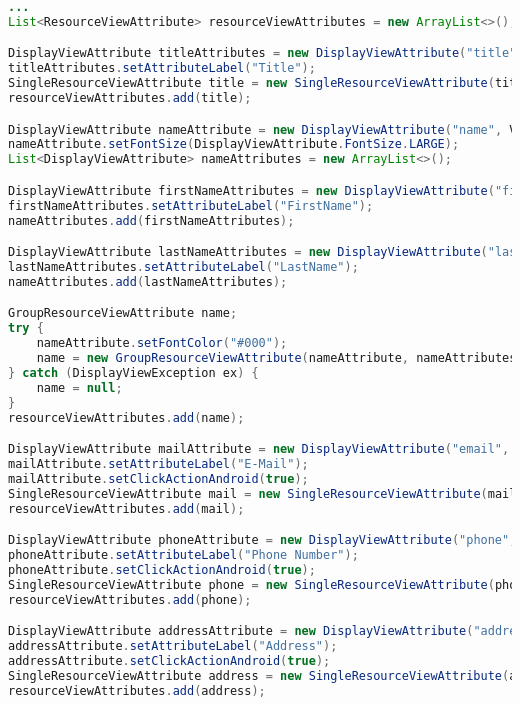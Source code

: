 \begin{lstlisting}[label=lst:cardview_impl,
language=java,
firstnumber=1,
caption=Erstellung einer CardView.]			
...
List<ResourceViewAttribute> resourceViewAttributes = new ArrayList<>();

DisplayViewAttribute titleAttributes = new DisplayViewAttribute("title", ViewAttribute.AttributeType.TEXT);
titleAttributes.setAttributeLabel("Title");
SingleResourceViewAttribute title = new SingleResourceViewAttribute(titleAttributes);
resourceViewAttributes.add(title);

DisplayViewAttribute nameAttribute = new DisplayViewAttribute("name", ViewAttribute.AttributeType.TEXT);
nameAttribute.setFontSize(DisplayViewAttribute.FontSize.LARGE);
List<DisplayViewAttribute> nameAttributes = new ArrayList<>();

DisplayViewAttribute firstNameAttributes = new DisplayViewAttribute("firstName", ViewAttribute.AttributeType.TEXT);
firstNameAttributes.setAttributeLabel("FirstName");
nameAttributes.add(firstNameAttributes);

DisplayViewAttribute lastNameAttributes = new DisplayViewAttribute("lastName", ViewAttribute.AttributeType.TEXT);
lastNameAttributes.setAttributeLabel("LastName");
nameAttributes.add(lastNameAttributes);

GroupResourceViewAttribute name;
try {
	nameAttribute.setFontColor("#000");
	name = new GroupResourceViewAttribute(nameAttribute, nameAttributes);
} catch (DisplayViewException ex) {
	name = null;
}
resourceViewAttributes.add(name);

DisplayViewAttribute mailAttribute = new DisplayViewAttribute("email", ViewAttribute.AttributeType.MAIL);
mailAttribute.setAttributeLabel("E-Mail");
mailAttribute.setClickActionAndroid(true);
SingleResourceViewAttribute mail = new SingleResourceViewAttribute(mailAttribute);
resourceViewAttributes.add(mail);

DisplayViewAttribute phoneAttribute = new DisplayViewAttribute("phone", ViewAttribute.AttributeType.PHONE_NUMBER);
phoneAttribute.setAttributeLabel("Phone Number");
phoneAttribute.setClickActionAndroid(true);
SingleResourceViewAttribute phone = new SingleResourceViewAttribute(phoneAttribute);
resourceViewAttributes.add(phone);

DisplayViewAttribute addressAttribute = new DisplayViewAttribute("address", ViewAttribute.AttributeType.LOCATION);
addressAttribute.setAttributeLabel("Address");
addressAttribute.setClickActionAndroid(true);
SingleResourceViewAttribute address = new SingleResourceViewAttribute(addressAttribute);
resourceViewAttributes.add(address);


\end{lstlisting}

